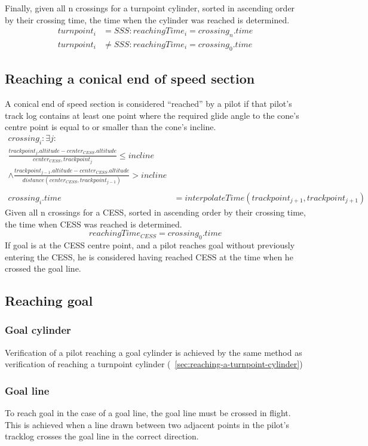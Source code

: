 \documentclass{article}
\begin{document}
Finally, given all n crossings for a turnpoint cylinder, sorted in ascending
order by their crossing time, the time when the cylinder was reached is
determined.
\begin{align*}
    turnpoint_i &= SSS : reachingTime_i = crossing_n . time \\
    turnpoint_i &\neq SSS : reachingTime_i = crossing_0 . time
\end{align*}
\subsection{Reaching a conical end of speed section}
\begin{pg}
A conical end of speed section is considered “reached” by a pilot if that
pilot’s track log contains at least one point where the required glide angle to
the cone’s centre point is equal to or smaller than the cone’s incline.
\begin{align*}
    crossing_i : \exists j : \\
    \frac{trackpoint_j . altitude - center_{CESS} . altitude}{center_{CESS}, trackpoint_{j}} \leq incline \\
    \land \frac{trackpoint_{j - 1} . altitude - center_{CESS} . altitude}{distance(center_{CESS}, trackpoint_{j - 1})} > incline \\
    \\
    crossing_i . time &= interpolateTime(trackpoint_{j + 1}, trackpoint_{j + 1})
\end{align*}
Given all n crossings for a CESS, sorted in ascending order by their crossing
time, the time when CESS was reached is determined.
\[ reachingTime_{CESS} = crossing_0 . time \]
If goal is at the CESS centre point, and a pilot reaches goal without
previously entering the CESS, he is considered having reached CESS at the time
when he crossed the goal line.
\end{pg}

\subsection{Reaching goal}
\subsubsection{Goal cylinder}
Verification of a pilot reaching a goal cylinder is achieved by the same method
as verification of reaching a turnpoint cylinder (~\ref{sec:reaching-a-turnpoint-cylinder})

\subsubsection{Goal line}
To reach goal in the case of a goal line, the goal line must be crossed in
flight. This is achieved when a line drawn between two adjacent points in the
pilot’s tracklog crosses the goal line in the correct direction.
\end{document}
